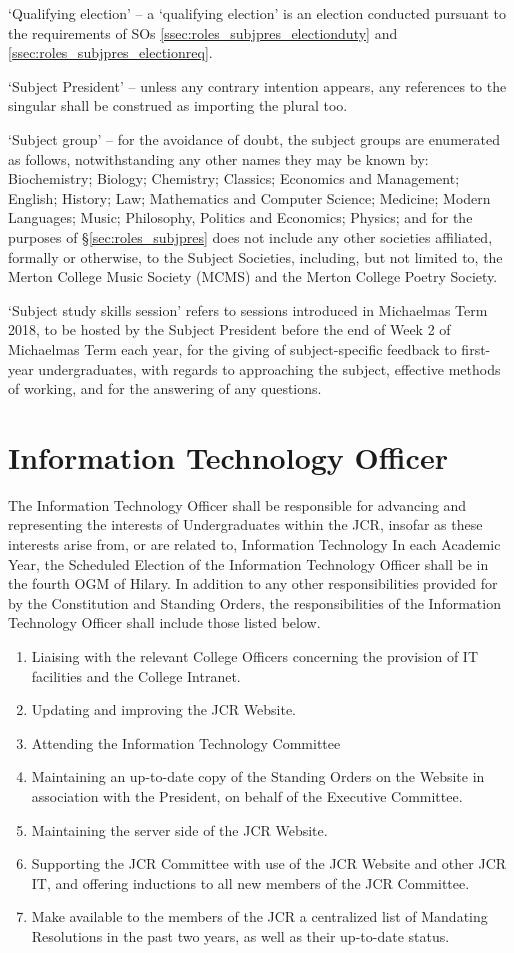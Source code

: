 `Qualifying election' – a `qualifying election' is an election conducted pursuant to the requirements of SOs \ref{ssec:roles_subjpres_electionduty} and \ref{ssec:roles_subjpres_electionreq}.

`Subject President' – unless any contrary intention appears, any references to the singular shall be construed as importing the plural too.

`Subject group' – for the avoidance of doubt, the subject groups are enumerated as follows, notwithstanding any other names they may be known by: Biochemistry; Biology; Chemistry; Classics; Economics and Management; English; History; Law; Mathematics and Computer Science; Medicine; Modern Languages; Music; Philosophy, Politics and Economics; Physics; and for the purposes of §\ref{sec:roles_subjpres} does not include any other societies affiliated, formally or otherwise, to the Subject Societies, including, but not limited to, the Merton College Music Society (MCMS) and the Merton College Poetry Society.

`Subject study skills session' refers to sessions introduced in Michaelmas Term 2018, to be hosted by the Subject President before the end of Week 2 of Michaelmas Term each year, for the giving of subject-specific feedback to first-year undergraduates, with regards to approaching the subject, effective methods of working, and for the answering of any questions.
\section{Information Technology Officer}
\npara The Information Technology Officer shall be responsible for advancing and representing the interests of Undergraduates within the JCR, insofar as these interests arise from, or are related to, Information Technology
\npara In each Academic Year, the Scheduled Election of the Information Technology Officer shall be in the fourth OGM of Hilary.
\npara In addition to any other responsibilities provided for by the Constitution and Standing Orders, the responsibilities of the Information Technology Officer shall include those listed below.
\begin{enumerate}
    \item Liaising with the relevant College Officers concerning the provision of IT facilities and the College Intranet. 
    \item Updating and improving the JCR Website.
    \item Attending the Information Technology Committee 
    \item Maintaining an up-to-date copy of the Standing Orders on the Website in association with the President, on behalf of the Executive Committee. 
    \item Maintaining the server side of the JCR Website. 
    \item Supporting the JCR Committee with use of the JCR Website and other JCR IT, and offering inductions to all new members of the JCR Committee.
    \item Make available to the members of the JCR a centralized list of Mandating Resolutions in the past two years, as well as their up-to-date status.
\end{enumerate}

